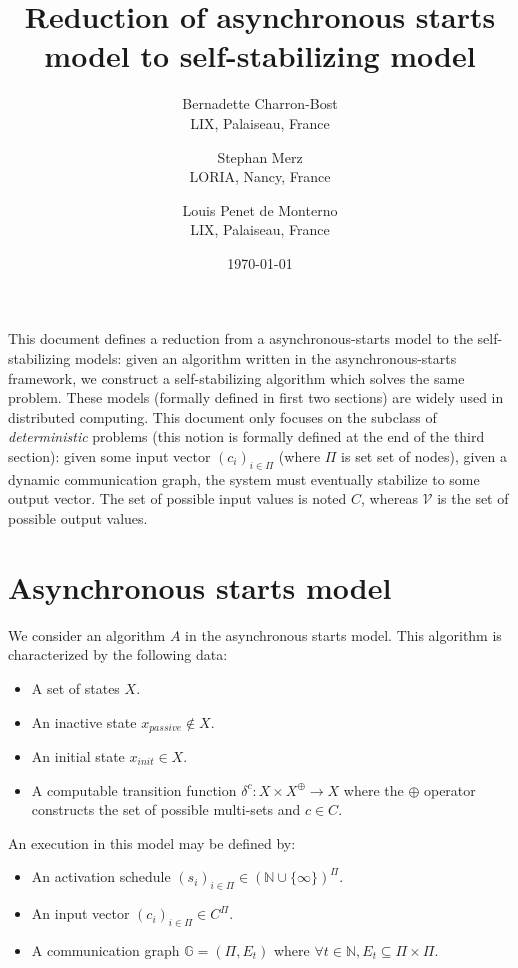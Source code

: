 \documentclass[11pt,letterpaper]{article}
\title{Reduction of asynchronous starts model to self-stabilizing model}
\author{
	Bernadette Charron-Bost \\
	LIX, Palaiseau, France
\and
	Stephan Merz \\
	LORIA, Nancy, France
\and
	Louis Penet de Monterno \\
	LIX, Palaiseau, France
}
\date{\today}
\begin{document}
  \maketitle

This document defines a reduction from a asynchronous-starts model to the self-stabilizing models:
given an algorithm written in the asynchronous-starts framework, we construct a self-stabilizing algorithm which solves the same problem.
These models (formally defined in first two sections) are widely used in distributed computing.
This document only focuses on the subclass of \textit{deterministic} problems (this notion is formally defined at the end of the third section):
given some input vector $(c_i)_{i \in \Pi}$ (where $\Pi$ is set set of nodes), given a dynamic communication graph, the system must eventually stabilize to some output vector.
The set of possible input values is noted $C$, whereas $\mathcal{V}$ is the set of possible output values.

\section{Asynchronous starts model}

We consider an algorithm $A$ in the asynchronous starts model.
This algorithm is characterized by the following data:

\begin{itemize}
	\item A set of states $X$.
	\item An inactive state $x_{passive} \notin X$.
	\item An initial state $x_{init} \in X$.
	\item A computable transition function $\delta^c : X \times X^\oplus \rightarrow X$ where the $\oplus$ operator constructs the set of possible multi-sets and $c \in C$.
\end{itemize}

\noindent An execution in this model may be defined by:
\begin{itemize}
	\item An activation schedule $(s_i)_{i \in \Pi} \in (\mathds{N} \cup \{\infty\})^\Pi$.
	\item An input vector $(c_i)_{i \in \Pi} \in C^\Pi$.
	\item A communication graph $\mathds{G} = (\Pi, E_t)$ where $\forall t \in \mathds{N}, E_t \subseteq \Pi \times \Pi$.
\end{itemize}
\end{document}
